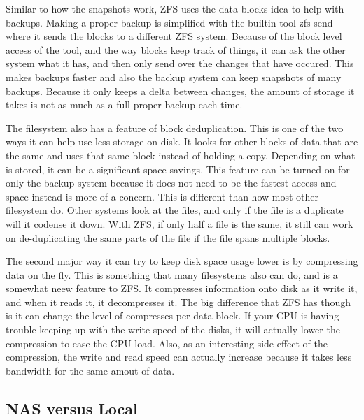 \documentclass[12pt]{article}
\begin{document}
Similar to how the snapshots work, ZFS uses the data blocks idea to help with backups.
Making a proper backup is simplified with the builtin tool zfs-send where it sends the blocks to a different ZFS system.
Because of the block level access of the tool, and the way blocks keep track of things, it can ask the other system what it has, and then only send over the changes that have occured.
This makes backups faster and also the backup system can keep snapshots of many backups.
Because it only keeps a delta between changes, the amount of storage it takes is not as much as a full proper backup each time.

The filesystem also has a feature of block deduplication.
This is one of the two ways it can help use less storage on disk.
It looks for other blocks of data that are the same and uses that same block instead of holding a copy.
Depending on what is stored, it can be a significant space savings.
This feature can be turned on for only the backup system because it does not need to be the fastest access and space instead is more of a concern.
This is different than how most other filesystem do.
Other systems look at the files, and only if the file is a duplicate will it codense it down.
With ZFS, if only half a file is the same, it still can work on de-duplicating the same parts of the file if the file spans multiple blocks.

The second major way it can try to keep disk space usage lower is by compressing data on the fly.
This is something that many filesystems also can do, and is a somewhat neew feature to ZFS.
It compresses information onto disk as it write it, and when it reads it, it decompresses it.
The big difference that ZFS has though is it can change the level of compresses per data block.
If your CPU is having trouble keeping up with the write speed of the disks, it will actually lower the compression to ease the CPU load.
Also, as an interesting side effect of the compression, the write and read speed can actually increase because it takes less bandwidth for the same amout of data.

\subsection{NAS versus Local}
\end{document}
